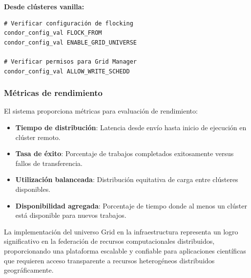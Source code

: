 \textbf{Desde clústeres vanilla:}

\begin{verbatim}
# Verificar configuración de flocking
condor_config_val FLOCK_FROM
condor_config_val ENABLE_GRID_UNIVERSE

# Verificar permisos para Grid Manager
condor_config_val ALLOW_WRITE_SCHEDD
\end{verbatim}

\subsubsection{Métricas de rendimiento}
\noindent

El sistema proporciona métricas para evaluación de rendimiento:

\begin{itemize}
	\item \textbf{Tiempo de distribución}: Latencia desde envío hasta inicio de ejecución en clúster remoto.
	
	\item \textbf{Tasa de éxito}: Porcentaje de trabajos completados exitosamente versus fallos de transferencia.
	
	\item \textbf{Utilización balanceada}: Distribución equitativa de carga entre clústeres disponibles.
	
	\item \textbf{Disponibilidad agregada}: Porcentaje de tiempo donde al menos un clúster está disponible para nuevos trabajos.
\end{itemize}

La implementación del universo Grid en la infraestructura \GRID representa un logro significativo en la federación de recursos computacionales distribuidos, proporcionando una plataforma escalable y confiable para aplicaciones científicas que requieren acceso transparente a recursos heterogéneos distribuidos geográficamente.
